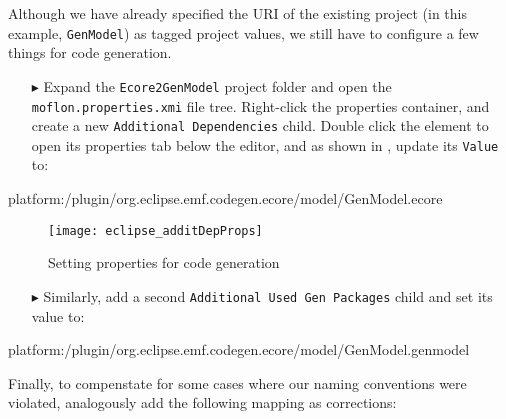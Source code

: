 Although we have already specified the URI of the existing project (in this example, \texttt{GenModel}) as tagged project values, we still have to 
configure a few things for code generation.

\begin{enumerate}
  
\item[$\blacktriangleright$] Expand the \texttt{Ecore2GenModel} project folder and open the \texttt{mof\-lon.\-prop\-er\-ties.\-xmi} file tree. Right-click the
properties container, and create a new \texttt{Add\-it\-ion\-al Dep\-en\-den\-cies} child. Double click the element to open its properties tab below the
editor, and as shown in , update its \texttt{Value} to:\\
\end{enumerate}

\vspace{-1cm}
{\small \ttfamily  platform:/plugin/org.eclipse.emf.codegen.ecore/model/GenModel.ecore} \\
\vspace{-0.5cm}

\begin{figure}[htbp]
\begin{centering}
\texttt{[image: eclipse\_additDepProps]}
  \caption{Setting properties for code generation}  
  \label{eclipse:addDepChild}
\end{centering}
\end{figure} 

\begin{enumerate}

\item[$\blacktriangleright$] Similarly, add a second \texttt{Additional Used Gen Packages} child and set its value to: \\
\end{enumerate}

\vspace{-1cm}
{\small \ttfamily platform:\-/\-plugin/\-org.\-eclipse.\-emf.\-codegen.\-ecore/\-model/\-GenModel.\-genmodel}

\newpage
Finally, to compenstate for some cases where our naming conventions were violated, analogously add the following mapping as corrections:

